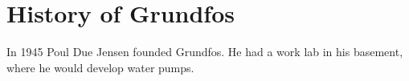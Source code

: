 \chapter{History of Grundfos} \label{ch:History of Grundfos}

In 1945 Poul Due Jensen founded Grundfos. He had a work lab in his basement, where he would develop water pumps. 
